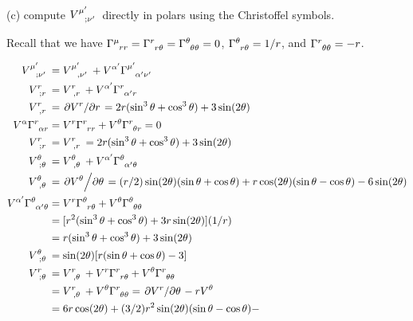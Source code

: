 \message{ !name(gr-ch5-notes.tex)}\documentclass[gr-notes.tex]{subfiles}
\begin{document}
(c) compute $\tensor{V}{^{\mu'}_{;\nu'}}$ directly in polars using the Christoffel symbols.

Recall that we have $\tensor{\Gamma}{^\mu_{rr}} = \tensor{\Gamma}{^r_{r\theta}} = \tensor{\Gamma}{^\theta_{\theta\theta}} = 0$, $\tensor{\Gamma}{^\theta_{r\theta}} = 1/r$, and $\tensor{\Gamma}{^r_{\theta\theta}} = -r$.

\begin{align*}
  \tensor{V}{^{\mu'}_{;\nu'}} &=
  \tensor{V}{^{\mu'}_{,\nu'}} +
  \tensor{V}{^{\alpha'}} \tensor{\Gamma}{^{\mu'}_{\alpha'\nu'}}
  \\
  \tensor{V}{^r_{;r}} &=
  \tensor{V}{^r_{,r}} +
  \tensor{V}{^{\alpha'}} \tensor{\Gamma}{^r_{\alpha'r}}
  \\
  \tensor{V}{^r_{,r}} &=
  \pdv*{V^r}{r} =
  2 r (\sin^3\theta + \cos^3\theta) + 3 \sin(2\theta)
  \\
  \tensor{V}{^\alpha} \tensor{\Gamma}{^r_{\alpha r}} &=
  V^r     \tensor{\Gamma}{^r_{rr}} +
  V^\theta \tensor{\Gamma}{^r_{\theta r}} =
  0
  \\
  \tensor{V}{^r_{;r}} &=
  \tensor{V}{^r_{,r}} =
  2 r (\sin^3\theta + \cos^3\theta) + 3 \sin(2\theta)
  \\
  \tensor{V}{^\theta_{;\theta}} &=
  \tensor{V}{^\theta_{,\theta}} +
  \tensor{V}{^{\alpha'}} \tensor{\Gamma}{^\theta_{\alpha'\theta}}
  \\
  \tensor{V}{^\theta_{,\theta}} &=
  \pdv*{V^\theta}{\theta} =
  (r/2) \sin(2\theta) (\sin\theta + \cos\theta) +
  r \cos(2\theta) (\sin\theta - \cos\theta) -
  6 \sin(2\theta)
  \\
  \tensor{V}{^{\alpha'}} \tensor{\Gamma}{^\theta_{\alpha'\theta}} &=
  \tensor{V}{^r} \tensor{\Gamma}{^\theta_{r\theta}} +
  \tensor{V}{^\theta} \tensor{\Gamma}{^\theta_{\theta\theta}}
  \\ &=
  [r^2 (\sin^3\theta + \cos^3\theta) + 3r \sin(2\theta)] (1/r)
  \\ &=
  r (\sin^3\theta + \cos^3\theta) + 3 \sin(2\theta)
  \\
  \tensor{V}{^\theta_{;\theta}} &=
  \sin(2\theta) [r (\sin\theta + \cos\theta) - 3]
  \\
  \tensor{V}{^r_{;\theta}} &=
  \tensor{V}{^r_{,\theta}} +
  V^r \tensor{\Gamma}{^r_{r\theta}} +
  V^\theta \tensor{\Gamma}{^r_{\theta\theta}}
  \\ &=
  \tensor{V}{^r_{,\theta}} +
  V^\theta \tensor{\Gamma}{^r_{\theta\theta}} =
  \pdv*{V^r}{\theta} - r V^\theta
  \\ &=
  6 r \cos(2\theta) +
  (3/2) r^2 \sin(2\theta) (\sin\theta-\cos\theta) -

\end{align*}
\end{document}
